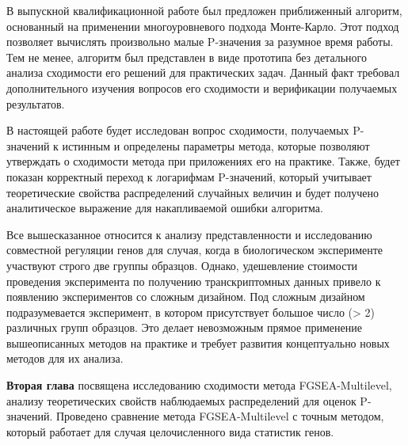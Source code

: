 В выпускной квалификационной работе \cite{KorotkevichVKR} был предложен приближенный алгоритм, основанный на применении многоуровневого подхода Монте-Карло.
Этот подход позволяет вычислять произвольно малые P-значения за разумное время работы.
Тем не менее, алгоритм был представлен в виде прототипа без детального анализа сходимости его решений для практических задач.
Данный факт требовал дополнительного изучения вопросов его сходимости и верификации получаемых результатов.

В настоящей работе будет исследован вопрос сходимости, получаемых P-значений к истинным и определены параметры метода, которые позволяют утверждать о сходимости метода при приложениях его на практике.
Также, будет показан корректный переход к логарифмам P-значений, который учитывает теоретические свойства распределений случайных величин и будет получено аналитическое выражение для накапливаемой ошибки алгоритма.

Все вышесказанное относится к анализу представленности и исследованию совместной регуляции генов для случая, когда в биологическом эксперименте участвуют строго две группы образцов.
Однако, удешевление стоимости проведения эксперимента по получению транскриптомных данных привело к появлению экспериментов со сложным дизайном.
Под сложным дизайном подразумевается эксперимент, в котором присутствует  большое число (> 2) различных групп образцов.
Это делает невозможным прямое применение вышеописанных методов на практике и требует развития концептуально новых методов для их анализа.





\textbf{Вторая глава} посвящена исследованию сходимости метода FGSEA-Multilevel, анализу теоретических свойств наблюдаемых распределений для оценок P-значений.
Проведено сравнение метода FGSEA-Multilevel с точным методом, который работает для случая целочисленного вида статистик генов.

